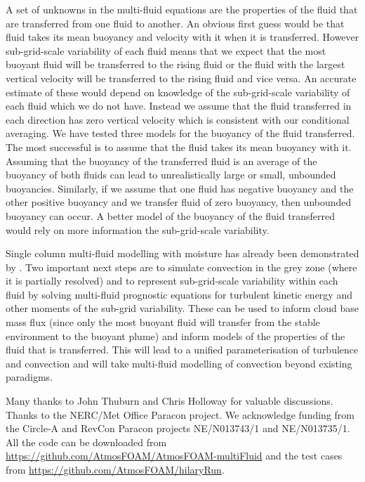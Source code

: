 \documentclass[draft]{agujournal2019}
\begin{document}
A set of unknowns in the multi-fluid equations are the properties
of the fluid that are transferred from one fluid to another. An obvious
first guess would be that fluid takes its mean buoyancy and velocity
with it when it is transferred. However sub-grid-scale variability
of each fluid means that we expect that the most buoyant fluid will
be transferred to the rising fluid or the fluid with the largest vertical
velocity will be transferred to the rising fluid and vice versa. An
accurate estimate of these would depend on knowledge of the sub-grid-scale
variability of each fluid which we do not have. Instead we assume
that the fluid transferred in each direction has zero vertical velocity
which is consistent with our conditional averaging. We have tested
three models for the buoyancy of the fluid transferred. The most successful
is to assume that the fluid takes its mean buoyancy with it. Assuming
that the buoyancy of the transferred fluid is an average of the buoyancy
of both fluids can lead to unrealistically large or small, unbounded
buoyancies. Similarly, if we assume that one fluid has negative buoyancy
and the other positive buoyancy and we transfer fluid of zero buoyancy,
then unbounded buoyancy can occur. A better model of the buoyancy
of the fluid transferred would rely on more information the sub-grid-scale
variability.

Single column multi-fluid modelling with moisture has already been
demonstrated by  
.
Two important next steps are to simulate
convection in the grey zone (where it is partially resolved) and to
represent sub-grid-scale variability within each fluid by solving
multi-fluid prognostic equations for turbulent kinetic energy and
other moments of the sub-grid variability. These can be used to inform
cloud base mass flux (since only the most buoyant fluid will transfer
from the stable environment to the buoyant plume) and inform models
of the properties of the fluid that is transferred. This will lead
to a unified parameterisation of turbulence and convection and will
take multi-fluid modelling of convection beyond existing paradigms. 

\acknowledgments

Many thanks to John Thuburn and Chris Holloway for valuable discussions.
Thanks to the NERC/Met Office Paracon project. We acknowledge funding
from the Circle-A and RevCon Paracon projects NE/N013743/1 and NE/N013735/1. All the code can be downloaded from \url{https://github.com/AtmosFOAM/AtmosFOAM-multiFluid} and the test cases from \url{https://github.com/AtmosFOAM/hilaryRun}.


\end{document}
